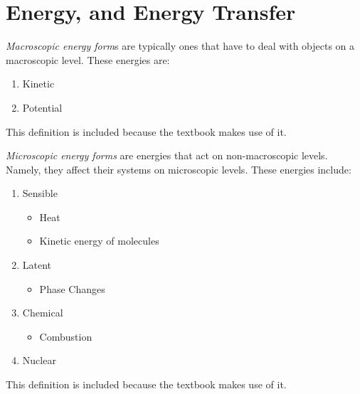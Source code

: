 \section{Energy, and Energy Transfer}\label{sec:Energy_Energy_Transfer}
\begin{definition}\label{def:Macroscopic_Energy_Form}
  \emph{Macroscopic energy form}s are typically ones that have to deal with objects on a macroscopic level.
  These energies are:
  \begin{enumerate}[noitemsep]
  \item Kinetic
  \item Potential
  \end{enumerate}

  \begin{remark}
    This definition is included because the textbook makes use of it.
  \end{remark}
\end{definition}

\begin{definition}\label{def:Microscopic_Energy_Form}
  \emph{Microscopic energy forms} are energies that act on non-macroscopic levels.
  Namely, they affect their systems on microscopic levels.
  These energies include:
  \begin{enumerate}[noitemsep]
  \item Sensible
    \begin{itemize}[noitemsep]
    \item Heat
    \item Kinetic energy of molecules
    \end{itemize}
  \item Latent
    \begin{itemize}[noitemsep]
    \item Phase Changes
    \end{itemize}
  \item Chemical
    \begin{itemize}[noitemsep]
    \item Combustion
    \end{itemize}
  \item Nuclear
  \end{enumerate}

  \begin{remark}
    This definition is included because the textbook makes use of it.
  \end{remark}
\end{definition}


